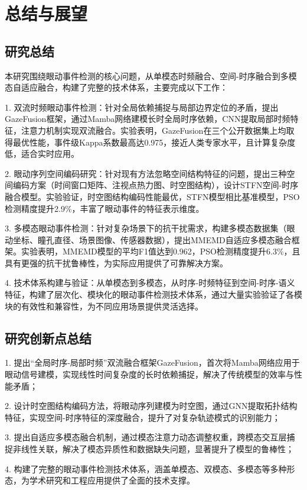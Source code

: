 \documentclass{xdupgthesis}
\newcommand{\ModelTF}{GazeFusion}
\begin{document}
\chapter{总结与展望}

\section{研究总结}

本研究围绕眼动事件检测的核心问题，从单模态时频融合、空间-时序融合到多模态自适应融合，构建了完整的技术体系，主要完成以下工作：

1. 双流时频眼动事件检测：针对全局依赖捕捉与局部边界定位的矛盾，提出\ModelTF{}框架，通过Mamba网络建模长时全局时序依赖，CNN提取局部时频特征，注意力机制实现双流融合。实验表明，\ModelTF{}在三个公开数据集上均取得最优性能，事件级Kappa系数最高达0.975，接近人类专家水平，且计算复杂度低，适合实时应用。

2. 眼动序列空间编码研究：针对现有方法忽略空间结构特征的问题，提出三种空间编码方案（时间窗口矩阵、注视点热力图、时空图结构），设计STFN空间-时序融合模型。实验验证，时空图结构编码性能最优，STFN模型相比基准模型，PSO检测精度提升2.9\%，丰富了眼动事件的特征表示维度。

3. 多模态眼动事件检测：针对复杂场景下的抗干扰需求，构建多模态数据集（眼动坐标、瞳孔直径、场景图像、传感器数据），提出MMEMD自适应多模态融合框架。实验表明，MMEMD模型的平均F1值达到0.962，PSO检测精度提升6.3\%，且具有更强的抗干扰鲁棒性，为实际应用提供了可靠解决方案。

4. 技术体系构建与验证：从单模态到多模态，从时序-时频特征到空间-时序-语义特征，构建了层次化、模块化的眼动事件检测技术体系，通过大量实验验证了各模块的有效性和兼容性，为不同应用场景提供灵活选择。

\section{研究创新点总结}

1. 提出“全局时序-局部时频”双流融合框架\ModelTF{}，首次将Mamba网络应用于眼动信号建模，实现线性时间复杂度的长时依赖捕捉，解决了传统模型的效率与性能矛盾；

2. 设计时空图结构编码方法，将眼动序列建模为时空图，通过GNN提取拓扑结构特征，实现空间-时序特征的深度融合，提升了对复杂轨迹模式的识别能力；

3. 提出自适应多模态融合机制，通过模态注意力动态调整权重，跨模态交互层捕捉非线性关联，解决了模态异质性和数据缺失问题，显著提升了模型的鲁棒性；

4. 构建了完整的眼动事件检测技术体系，涵盖单模态、双模态、多模态等多种形态，为学术研究和工程应用提供了全面的技术支撑。
\end{document}
